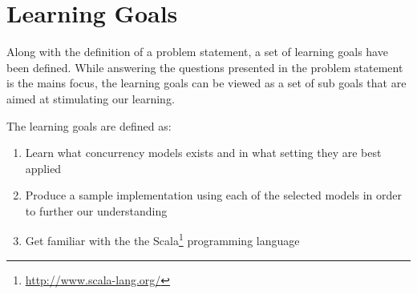 \section{Learning Goals}
Along with the definition of a problem statement, a set of learning goals have been defined. While answering the questions presented in the problem statement is the mains focus, the learning goals can be viewed as a set of sub goals that are aimed at stimulating our learning.

The learning goals are defined as:
\begin{enumerate}
\item Learn what concurrency models exists and in what setting they are best applied
\item Produce a sample implementation using each of the selected models in order to further our understanding
\item Get familiar with the the Scala\footnote{\url{http://www.scala-lang.org/}} programming language
\end{enumerate}

\worksheetend